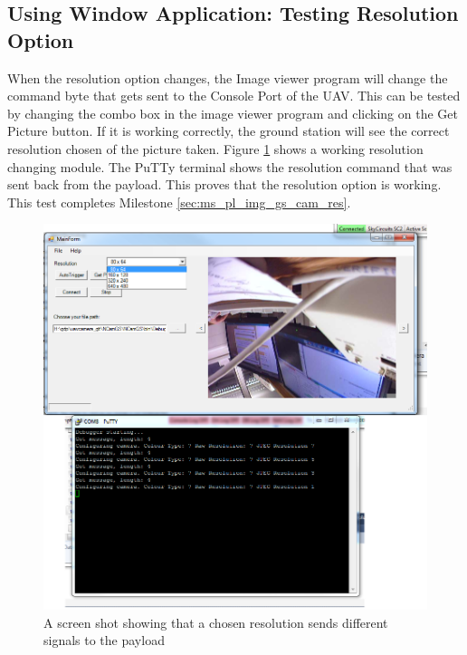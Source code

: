 \subsection{Using Window Application: Testing Resolution Option}
\label{test_res_op}
When the resolution option changes, the Image viewer program will change the command byte that gets sent to the Console Port of the UAV. 
This can be tested by changing the combo box in the image viewer program and clicking on the Get Picture button.
If it is working correctly, the ground station will see the correct resolution chosen of the picture taken.
Figure \ref{resolution testing} shows a working resolution changing module. 
The PuTTy terminal shows the resolution command that was sent back from the payload.
This proves that the resolution option is working.
This test completes Milestone \ref{sec:ms_pl_img_gs_cam_res}.
\begin{figure}[H]
\begin{center}
\includegraphics[width=1.00\textwidth]{testing_screenshots/change_res_ncam_1.png} 
\end{center}
\caption{A screen shot showing that a chosen resolution sends different signals to the payload\label{resolution testing}}
\end{figure}

